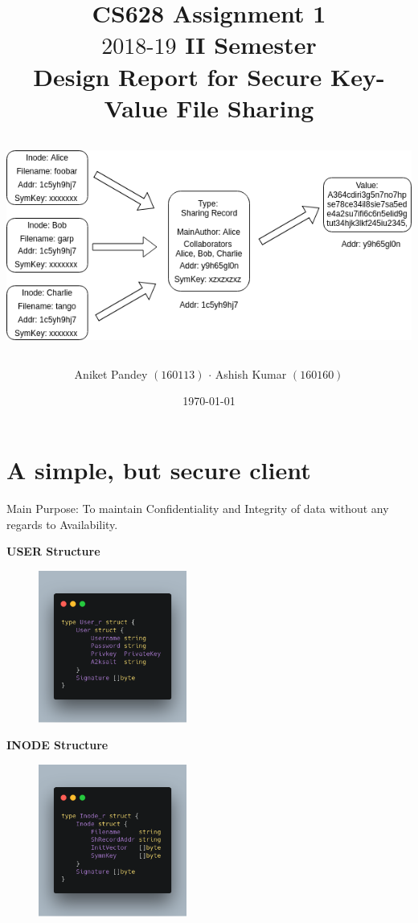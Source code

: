 \documentclass[a4paper, 12pt]{scrartcl}
\title{\vspace{40mm}CS628 Assignment 1 \\ $2018\text{-}19$  II Semester \\ \vspace{1cm} \textbf{Design Report for Secure Key-Value File Sharing}}
\subtitle{\includegraphics[width=\textwidth, height=7cm]{images/cs628.png}\vspace{20mm}}
\author{Aniket Pandey $(160113)$ $\cdot$ Ashish Kumar $(160160)$}
\date{\today}
\begin{document}
\clearpage\maketitle
\thispagestyle{empty}
\newpage


\section{A simple, but secure client}
Main Purpose: To maintain Confidentiality and Integrity of data without any regards to Availability.

\begin{multicols}{2}

\begin{center}
	\textbf{USER Structure}
\end{center}

\begin{center}
	\includegraphics[width=7cm, height=5cm]{images/user.png}
\end{center}

\columnbreak

\begin{center}
	\textbf{INODE Structure}
\end{center}

\begin{center}
	\includegraphics[width=7cm, height=5cm]{images/inode.png}
\end{center}

\end{multicols}
\end{document}
